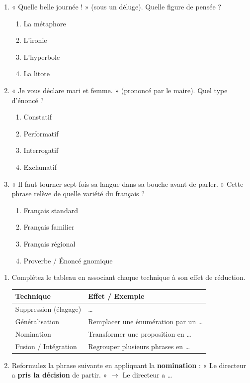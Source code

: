 \documentclass[11pt]{article}
\begin{document}
\begin{exercice}
\begin{enumerate}
    \item « Quelle belle journée ! » (sous un déluge). Quelle figure de pensée ?
    \begin{enumerate}
        \item La métaphore \item L'ironie \item L'hyperbole \item La litote
    \end{enumerate}
    \item « Je vous déclare mari et femme. » (prononcé par le maire). Quel type d'énoncé ?
    \begin{enumerate}
        \item Constatif \item Performatif \item Interrogatif \item Exclamatif
    \end{enumerate}
    \item « Il faut tourner sept fois sa langue dans sa bouche avant de parler. » Cette phrase relève de quelle variété du français ?
    \begin{enumerate}
        \item Français standard \item Français familier \item Français régional \item Proverbe / Énoncé gnomique
    \end{enumerate}
\end{enumerate}
\end{exercice}

\begin{exercice}
\begin{enumerate}
    \item Complétez le tableau en associant chaque technique à son effet de réduction.
    \begin{tabular}{|l|l|}
    \hline
    \textbf{Technique} & \textbf{Effet / Exemple} \\
    \hline
    Suppression (élagage) & \ldots \\
    \hline
    Généralisation & Remplacer une énumération par un \ldots \\
    \hline
    Nomination & Transformer une proposition en \ldots \\
    \hline
    Fusion / Intégration & Regrouper plusieurs phrases en \ldots \\
    \hline
    \end{tabular}
    \item Reformulez la phrase suivante en appliquant la \textbf{nomination} :
    « Le directeur a \textbf{pris la décision} de partir. » $\rightarrow$ Le directeur a \ldots
\end{enumerate}
\end{exercice}
\end{document}
